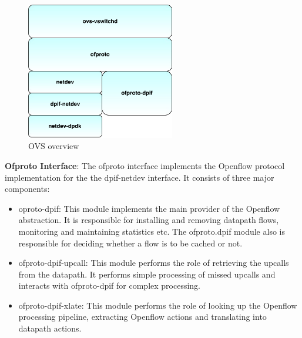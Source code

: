  \begin{figure}[H] 
	\centering   
	\caption{OVS overview}
	\includegraphics[height=6cm]{internals.pdf}
\end{figure}

\textbf{Ofproto Interface}: The ofproto interface implements the Openflow protocol implementation for the the dpif-netdev interface. It consists of three major components:
\begin{itemize}
	\item oproto-dpif: This module implements the main provider of the Openflow abstraction. It is responsible for installing and removing datapath flows, monitoring and maintaining statistics etc. The ofproto.dpif module also is responsible for deciding whether a flow is to be cached or not.
	\item ofproto-dpif-upcall: This module performs the role of retrieving the upcalls from the datapath. It performs simple processing of missed upcalls and interacts with ofproto-dpif for complex processing.
	\item ofproto-dpif-xlate: This module performs the role of looking up the Openflow processing pipeline, extracting Openflow actions and translating into datapath actions.
\end{itemize}


